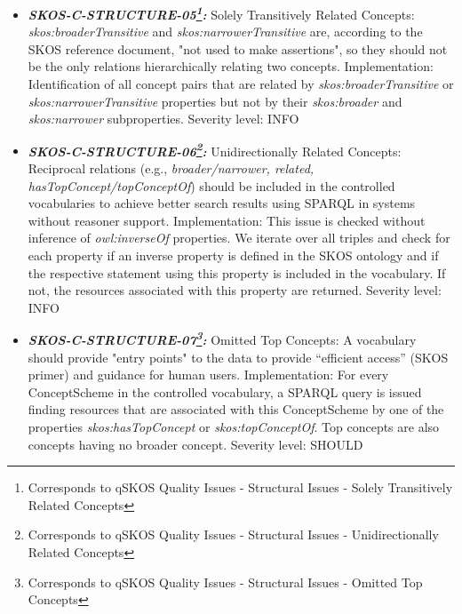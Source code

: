 \documentclass{llncs}
\begin{document}
\begin{itemize}
	Valueless Associative Relations:
	Two concepts are sibling, but also connected by an associative relation. In that context, the associative relation is not necessary. See ISO\_DIS\_25964-1, 11.3.2.2 
	Implementation:
	Identification of all pairs of concepts that have the same broader or narrower concepts, i.e. they are "sibling terms". All siblings that are related by a \emph{skos:related} property are returned. 
	Severity level: INFO
	\item \textbf{{\em SKOS-C-STRUCTURE-05\footnote{Corresponds to qSKOS Quality Issues - Structural Issues - Solely Transitively Related Concepts}:}}
	Solely Transitively Related Concepts:
	\emph{skos:broaderTransitive} and \emph{skos:narrowerTransitive} are, according to the SKOS reference document, "not used to make assertions", so they should not be the only relations hierarchically relating two concepts. 
	Implementation: Identification of all concept pairs that are related by \emph{skos:broaderTransitive} or \emph{skos:narrowerTransitive} properties but not by their \emph{skos:broader} and \emph{skos:narrower} subproperties. 
	Severity level: INFO
	\item \textbf{{\em SKOS-C-STRUCTURE-06\footnote{Corresponds to qSKOS Quality Issues - Structural Issues - Unidirectionally Related Concepts}:}}
	Unidirectionally Related Concepts:
	Reciprocal relations (e.g., \emph{broader/narrower, related, hasTopConcept/topConceptOf}) should be included in the controlled vocabularies to achieve better search results using SPARQL in systems without reasoner support. 
	Implementation:
	This issue is checked without inference of \emph{owl:inverseOf} properties. We iterate over all triples and check for each property if an inverse property is defined in the SKOS ontology and if the respective statement using this property is included in the vocabulary. If not, the resources associated with this property are returned. 
	Severity level: INFO
	\item \textbf{{\em SKOS-C-STRUCTURE-07\footnote{Corresponds to qSKOS Quality Issues - Structural Issues - Omitted Top Concepts}:}}
	Omitted Top Concepts:
	A vocabulary should provide "entry points" to the data to provide “efficient access” (SKOS primer) and guidance for human users. 
	Implementation:
	For every ConceptScheme in the controlled vocabulary, a SPARQL query is issued finding resources that are associated with this ConceptScheme by one of the properties \emph{skos:hasTopConcept} or \emph{skos:topConceptOf}. Top concepts are also concepts having no broader concept. 
	Severity level: SHOULD

\end{itemize}
\end{document}
